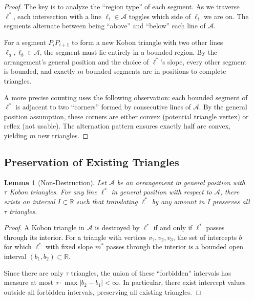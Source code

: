 \documentclass[11pt,a4paper]{article}
\theoremstyle{plain}
\newtheorem{lemma}[theorem]{Lemma}
\theoremstyle{definition}
\theoremstyle{remark}
\newcommand{\R}{\mathbb{R}}
\begin{document}
\begin{proof}
The key is to analyze the ``region type'' of each segment. As we traverse $\ell^*$, each intersection with a line $\ell_i \in \mathcal{A}$ toggles which side of $\ell_i$ we are on. The segments alternate between being ``above'' and ``below'' each line of $\mathcal{A}$.

For a segment $P_i P_{i+1}$ to form a new Kobon triangle with two other lines $\ell_a, \ell_b \in \mathcal{A}$, the segment must lie entirely in a bounded region. By the arrangement's general position and the choice of $\ell^*$'s slope, every other segment is bounded, and exactly $m$ bounded segments are in positions to complete triangles.

A more precise counting uses the following observation: each bounded segment of $\ell^*$ is adjacent to two ``corners'' formed by consecutive lines of $\mathcal{A}$. By the general position assumption, these corners are either convex (potential triangle vertex) or reflex (not usable). The alternation pattern ensures exactly half are convex, yielding $m$ new triangles.
\end{proof}

\subsection{Preservation of Existing Triangles}

\begin{lemma}[Non-Destruction]
\label{lem:nodestroy}
Let $\mathcal{A}$ be an arrangement in general position with $\tau$ Kobon triangles. For any line $\ell^*$ in general position with respect to $\mathcal{A}$, there exists an interval $I \subset \R$ such that translating $\ell^*$ by any amount in $I$ preserves all $\tau$ triangles.
\end{lemma}

\begin{proof}
A Kobon triangle in $\mathcal{A}$ is destroyed by $\ell^*$ if and only if $\ell^*$ passes through its interior. For a triangle with vertices $v_1, v_2, v_3$, the set of intercepts $b$ for which $\ell^*$ with fixed slope $m^*$ passes through the interior is a bounded open interval $(b_1, b_2) \subset \R$.

Since there are only $\tau$ triangles, the union of these ``forbidden'' intervals has measure at most $\tau \cdot \max|b_2 - b_1| < \infty$. In particular, there exist intercept values outside all forbidden intervals, preserving all existing triangles.
\end{proof}
\end{document}
